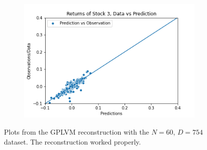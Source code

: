 \begin{figure}
\begin{subfigure}[r]{0.3\textwidth}
		\includegraphics[width=\textwidth]{img/07_0/N60/Q1_kernel1_stock3_scatter.png}
	\end{subfigure}
	\caption[Y-$\hat{Y}$ pair plots for N=60 with the GPLVM model]{Plots from the GPLVM reconstruction with the $N=60$, $D=754$ dataset. The reconstruction worked properly. }
	\label{fig:gplvm_N60_pairs}
\end{figure}
